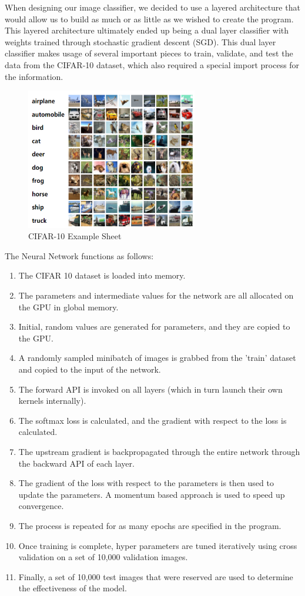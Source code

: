 \documentclass[conference]{IEEEtran}
\begin{document}
When designing our image classifier, we decided to use a layered architecture that would allow us to build as much or as little as we wished to create the program. This layered architecture ultimately ended up being a dual layer classifier with weights trained through stochastic gradient descent (SGD). This dual layer classifier makes usage of several important pieces to train, validate, and test the data from the CIFAR-10 dataset, which also required a special import process for the information.

\begin{figure}[htbp]
\centerline{\includegraphics[width=75mm]{cifar_categories.png}}
\caption{CIFAR-10 Example Sheet}
\label{CIFAR}
\end{figure}

The Neural Network functions as follows:

\begin{enumerate}
    \item The CIFAR 10 dataset is loaded into memory.
    \item The parameters and intermediate values for the network are all allocated on the GPU in global memory.
    \item Initial, random values are generated for parameters, and they are copied to the GPU.
    \item A randomly sampled minibatch of images is grabbed from the 'train' dataset and copied to the input of the network.
    \item The forward API is invoked on all layers (which in turn launch their own kernels internally).
    \item The softmax loss is calculated, and the gradient with respect to the loss is calculated.
    \item The upstream gradient is backpropagated through the entire network through the backward API of each layer.
    \item The gradient of the loss with respect to the parameters is then used to update the parameters. A momentum based approach is used to speed up convergence.
    \item The process is repeated for as many epochs are specified in the program.
    \item Once training is complete, hyper parameters are tuned iteratively using cross validation on a set of 10,000 validation images.
    \item Finally, a set of 10,000 test images that were reserved are used to determine the effectiveness of the model.
\end{enumerate}
\end{document}
